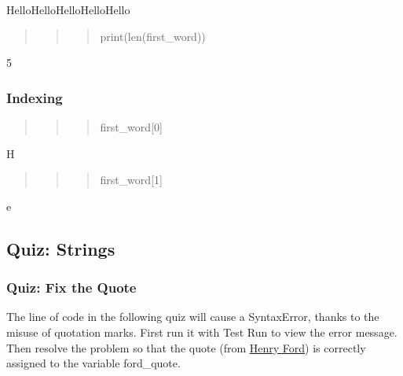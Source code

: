 \documentclass[11pt]{article}
\begin{document}
HelloHelloHelloHelloHello

\begin{quote}
\begin{quote}
\begin{quote}
print(len(first\_word))
\end{quote}
\end{quote}
\end{quote}

5

    \hypertarget{indexing}{%
\subsubsection{Indexing}\label{indexing}}

\begin{quote}
\begin{quote}
\begin{quote}
first\_word{[}0{]}
\end{quote}
\end{quote}
\end{quote}

H

\begin{quote}
\begin{quote}
\begin{quote}
first\_word{[}1{]}
\end{quote}
\end{quote}
\end{quote}

e

    \hypertarget{quiz-strings}{%
\subsection{Quiz: Strings}\label{quiz-strings}}

    \hypertarget{quiz-fix-the-quote}{%
\subsubsection{Quiz: Fix the Quote}\label{quiz-fix-the-quote}}

The line of code in the following quiz will cause a SyntaxError, thanks
to the misuse of quotation marks. First run it with Test Run to view the
error message. Then resolve the problem so that the quote (from
\href{https://www.goodreads.com/author/quotes/203714.Henry_Ford}{Henry
Ford}) is correctly assigned to the variable ford\_quote.
\end{document}
